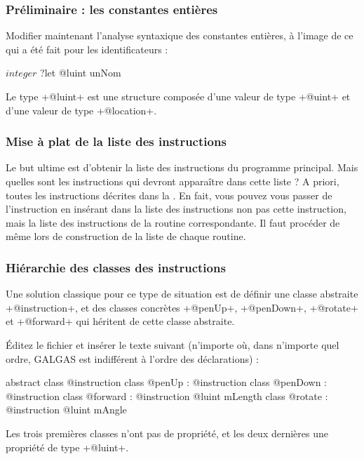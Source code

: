 \subsubsection{Préliminaire : les constantes entières}

Modifier maintenant l’analyse syntaxique des constantes entières, à l’image de ce qui a été fait pour les identificateurs :
\begin{galgas}
$integer$ ?let @luint unNom
\end{galgas}

Le type \ggs+@luint+ est une structure composée d’une valeur de type \ggs+@uint+ et d’une valeur de type \ggs+@location+.

\subsubsection{Mise à plat de la liste des instructions}
Le but ultime est d'obtenir la liste des instructions du programme principal. Mais quelles sont les instructions qui devront apparaître dans cette liste ? A priori, toutes les instructions décrites dans la . En fait, vous pouvez vous passer de l'instruction  en insérant dans la liste des instructions non pas cette instruction, mais la liste des instructions de la routine correspondante. Il faut procéder de même lors de construction de la liste de chaque routine.

\subsubsection{Hiérarchie des classes des instructions}
Une solution classique pour ce type de situation est de définir une classe abstraite \ggs+@instruction+, et des classes concrètes \ggs+@penUp+, \ggs+@penDown+, \ggs+@rotate+ et \ggs+@forward+ qui héritent de cette classe abstraite.

Éditez le fichier  et insérer le texte suivant (n’importe où, dans n’importe quel ordre, GALGAS est indifférent à l’ordre des déclarations) :

\begin{galgas}
abstract class @instruction {
}
class @penUp : @instruction {
}
class @penDown : @instruction {
}
class @forward : @instruction {
  @luint mLength
}
class @rotate : @instruction {
  @luint mAngle
}
\end{galgas}


Les trois premières classes n'ont pas de propriété, et les deux dernières une propriété de type \ggs+@luint+.

